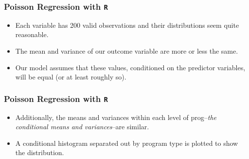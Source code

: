 \documentclass[00-GLMregslides.tex]{subfiles}
\begin{document}
\begin{frame}[fragile]

\frametitle{Poisson Regression with \texttt{R}}
\Large

\begin{itemize}
\item Each variable has 200 valid observations and their distributions seem quite reasonable. 
\item The mean and variance of our outcome variable are more or less the same. 
\item Our model assumes that these values, conditioned on the predictor variables, will be equal (or at least roughly so).
\end{itemize}
\end{frame}
\begin{frame}[fragile]
\frametitle{Poisson Regression with \texttt{R}}
\Large
\begin{itemize}
\item Additionally, the means and variances within each level of prog--\textit{the conditional means and variances}--are similar. 
\item A conditional histogram separated out by program type is plotted to show the distribution.
\end{itemize}


\end{frame}

%
%
%
%
%
		
%
\end{document}
